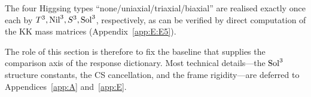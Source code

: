 The four Higgsing types ``none/uniaxial/triaxial/biaxial'' are realised
exactly once each by $T^3, \mathrm{Nil}^3, S^3, \mathrm{Sol}^3$, respectively,
as can be verified by direct computation of the KK mass matrices
(Appendix~\ref{app:E:E5}).

The role of this section is therefore to fix the baseline that supplies the
comparison axis of the response dictionary.  Most technical details---the
$\mathrm{Sol}^3$ structure constants, the CS cancellation, and the frame
rigidity---are deferred to Appendices~\ref{app:A} and~\ref{app:E}.
